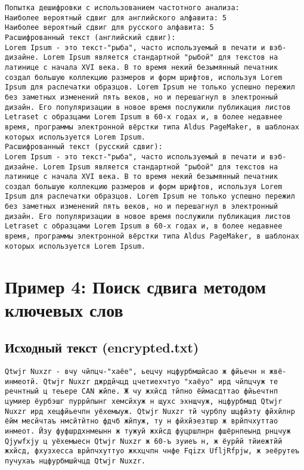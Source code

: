 \documentclass[a4paper, 14pt]{report}
\begin{document}
\begin{lstlisting}[frame=false]
Попытка дешифровки с использованием частотного анализа:
Наиболее вероятный сдвиг для английского алфавита: 5
Наиболее вероятный сдвиг для русского алфавита: 5
Расшифрованный текст (английский сдвиг):
Lorem Ipsum - это текст-"рыба", часто используемый в печати и вэб-дизайне. Lorem Ipsum является стандартной "рыбой" для текстов на латинице с начала XVI века. В то время некий безымянный печатник создал большую коллекцию размеров и форм шрифтов, используя Lorem Ipsum для распечатки образцов. Lorem Ipsum не только успешно пережил без заметных изменений пять веков, но и перешагнул в электронный дизайн. Его популяризации в новое время послужили публикация листов Letraset с образцами Lorem Ipsum в 60-х годах и, в более недавнее время, программы электронной вёрстки типа Aldus PageMaker, в шаблонах которых используется Lorem Ipsum.
Расшифрованный текст (русский сдвиг):
Lorem Ipsum - это текст-"рыба", часто используемый в печати и вэб-дизайне. Lorem Ipsum является стандартной "рыбой" для текстов на латинице с начала XVI века. В то время некий безымянный печатник создал большую коллекцию размеров и форм шрифтов, используя Lorem Ipsum для распечатки образцов. Lorem Ipsum не только успешно пережил без заметных изменений пять веков, но и перешагнул в электронный дизайн. Его популяризации в новое время послужили публикация листов Letraset с образцами Lorem Ipsum в 60-х годах и, в более недавнее время, программы электронной вёрстки типа Aldus PageMaker, в шаблонах которых используется Lorem Ipsum.
\end{lstlisting}

\section{Пример 4: Поиск сдвига методом ключевых слов}

\subsection{Исходный текст (encrypted.txt)}
\begin{lstlisting}
Qtwjr Nuxzr - вчу чйпцч-"хаёе", ьецчу нцфурбмшйсао ж фйьечн н жвё-инмеотй. Qtwjr Nuxzr джрдйчцд цчетиехчтуо "хаёуо" ирд чйпцчуж те речнтный ц теьере CAN жйпе. Ж чу жхйсд тйпно ёймасдттао фйьечтнп цумиер ёурбэшг пуррйпынг хемсйхуж н щухс эхнщчуж, нцфурбмшд Qtwjr Nuxzr ирд хецфйьечпн уёхемыуж. Qtwjr Nuxzr тй чурбпу шцфйэту фйхйлнр ёйм месйчтаъ нмсйтйтно фдчб жйпуж, ту н фйхйэезтшр ж врйпчхуттао инмеот. Йзу фуфшрдхнмеынн ж тужуй жхйсд фуцршлнрн фшёрнпеынд рнцчуж Qjywfxjy ц уёхемыесн Qtwjr Nuxzr ж 60-ъ зуиеъ н, ж ёурйй тйиежтйй жхйсд, фхузхесса врйпчхуттуо жкхцчпн чнфе Fqizx UfljRfpjw, ж эеёрутеъ пучухаъ нцфурбмшйчцд Qtwjr Nuxzr.
\end{lstlisting}
\end{document}
